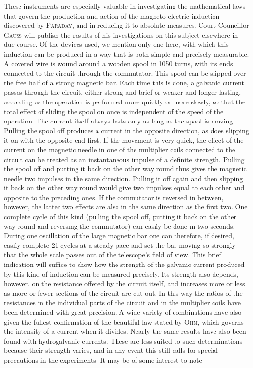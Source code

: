 These instruments are especially valuable in investigating the mathematical laws that govern the production and action of the magneto-electric induction discovered by \textsc{Faraday}, and in reducing it to absolute measures. Court Councillor \textsc{Gauss} will publish the results of his investigations on this subject elsewhere in due course. Of the devices used, we mention only one here, with which this induction can be produced in a way that is both simple and precisely measurable. A covered wire is wound around a wooden spool in 1050 turns, with its ends connected to the circuit through the commutator. This spool can be slipped over the free half of a strong magnetic bar. Each time this is done, a galvanic current passes through the circuit, either strong and brief or weaker and longer-lasting, according as the operation is performed more quickly or more slowly, so that the total effect of sliding the spool on once is independent of the speed of the operation. The current itself always lasts only as long as the spool is moving. Pulling the spool off produces a current in the opposite direction, as does slipping it on with the opposite end first. If the movement is very quick, the effect of the current on the magnetic needle in one of the multiplier coils connected to the circuit can be treated as an instantaneous impulse of a definite strength. Pulling the spool off and putting it back on the other way round thus gives the magnetic needle two impulses in the same direction. Pulling it off again and then slipping it back on the other way round would give two impulses equal to each other and opposite to the preceding ones. If the commutator is reversed in between, however, the latter two effects are also in the same direction as the first two. One complete cycle of this kind (pulling the spool off, putting it back on the other way round and reversing the commutator) can easily be done in two seconds. During one oscillation of the large magnetic bar one can therefore, if desired, easily complete 21 cycles at a steady pace and set the bar moving so strongly that the whole scale passes out of the telescope’s field of view. This brief indication will suffice to show how the strength of the galvanic current produced by this kind of induction can be measured precisely. Its strength also depends, however, on the resistance offered by the circuit itself, and increases more or less as more or fewer sections of the circuit are cut out. In this way the ratios of the resistances in the individual parts of the circuit and in the multiplier coils have been determined with great precision. A wide variety of combinations have also given the fullest confirmation of the beautiful law stated by \textsc{Ohm}, which governs the intensity of a current when it divides. Nearly the same results have also been found with hydrogalvanic currents. These are less suited to such determinations because their strength varies, and in any event this still calls for special precautions in the experiments. It may be of some interest to note
